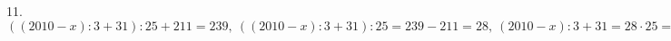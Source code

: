 11. $((2010-x):3+31):25+211=239,\ ((2010-x):3+31):25=239-211=28,\ (2010-x):3+31=28\cdot25=700,\ (2010-x):3=700-31=669,\ 2010-x=669\cdot3=2007,\ x=2010-2007=3.$\\
